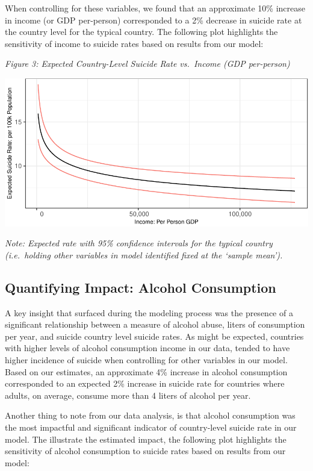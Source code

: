 \documentclass[]{article}
\begin{document}
When controlling for these variables, we found that an approximate 10\%
increase in income (or GDP per-person) corresponded to a 2\% decrease in
suicide rate at the country level for the typical country. The following
plot highlights the sensitivity of income to suicide rates based on
results from our model:

\emph{Figure 3: Expected Country-Level Suicide Rate vs.~Income (GDP
per-person)}

\begin{center}\includegraphics{Project_Report_files/figure-latex/agdp_plot-1} \end{center}

\emph{Note: Expected rate with 95\% confidence intervals for the typical
country (i.e.~holding other variables in model identified fixed at the
`sample mean').}

\subsection{Quantifying Impact: Alcohol
Consumption}\label{quantifying-impact-alcohol-consumption}

A key insight that surfaced during the modeling process was the presence
of a significant relationship between a measure of alcohol abuse, liters
of consumption per year, and suicide country level suicide rates. As
might be expected, countries with higher levels of alcohol consumption
income in our data, tended to have higher incidence of suicide when
controlling for other variables in our model. Based on our estimates, an
approximate 4\% increase in alcohol consumption corresponded to an
expected 2\% increase in suicide rate for countries where adults, on
average, consume more than 4 liters of alcohol per year.

Another thing to note from our data analysis, is that alcohol
consumption was the most impactful and significant indicator of
country-level suicide rate in our model. The illustrate the estimated
impact, the following plot highlights the sensitivity of alcohol
consumption to suicide rates based on results from our model:
\end{document}
